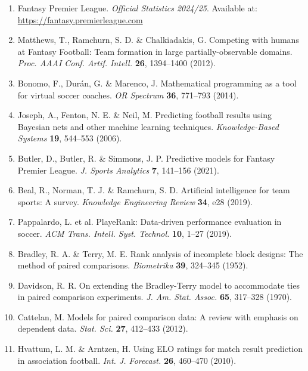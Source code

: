 \documentclass[10pt,a4paper,twocolumn]{article}
\begin{document}
\small
\begin{enumerate}
\item Fantasy Premier League. \textit{Official Statistics 2024/25}. Available at: \url{https://fantasy.premierleague.com}

\item Matthews, T., Ramchurn, S. D. \& Chalkiadakis, G. Competing with humans at Fantasy Football: Team formation in large partially-observable domains. \textit{Proc. AAAI Conf. Artif. Intell.} \textbf{26}, 1394–1400 (2012).

\item Bonomo, F., Durán, G. \& Marenco, J. Mathematical programming as a tool for virtual soccer coaches. \textit{OR Spectrum} \textbf{36}, 771–793 (2014).

\item Joseph, A., Fenton, N. E. \& Neil, M. Predicting football results using Bayesian nets and other machine learning techniques. \textit{Knowledge-Based Systems} \textbf{19}, 544–553 (2006).

\item Butler, D., Butler, R. \& Simmons, J. P. Predictive models for Fantasy Premier League. \textit{J. Sports Analytics} \textbf{7}, 141–156 (2021).

\item Beal, R., Norman, T. J. \& Ramchurn, S. D. Artificial intelligence for team sports: A survey. \textit{Knowledge Engineering Review} \textbf{34}, e28 (2019).

\item Pappalardo, L. et al. PlayeRank: Data-driven performance evaluation in soccer. \textit{ACM Trans. Intell. Syst. Technol.} \textbf{10}, 1–27 (2019).

\item Bradley, R. A. \& Terry, M. E. Rank analysis of incomplete block designs: The method of paired comparisons. \textit{Biometrika} \textbf{39}, 324–345 (1952).

\item Davidson, R. R. On extending the Bradley-Terry model to accommodate ties in paired comparison experiments. \textit{J. Am. Stat. Assoc.} \textbf{65}, 317–328 (1970).

\item Cattelan, M. Models for paired comparison data: A review with emphasis on dependent data. \textit{Stat. Sci.} \textbf{27}, 412–433 (2012).

\item Hvattum, L. M. \& Arntzen, H. Using ELO ratings for match result prediction in association football. \textit{Int. J. Forecast.} \textbf{26}, 460–470 (2010).


\end{enumerate}
\end{document}
